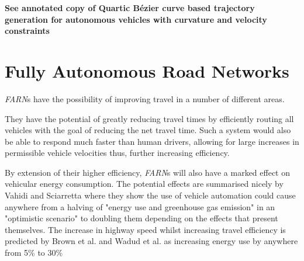 \textbf{See annotated copy of Quartic Bézier curve based trajectory generation for autonomous vehicles with curvature and velocity constraints \cite{chenQuarticBezierCurve2014}}

\section{Fully Autonomous Road Networks}

\textit{FARN}s have the possibility of improving travel in a number of different areas. 

They have the potential of greatly reducing travel times by efficiently routing all vehicles with the goal of reducing the net travel time. Such a system would also be able to respond much faster than human drivers, allowing for large increases in permissible vehicle velocities thus, further increasing efficiency.

By extension of their higher efficiency, \textit{FARN}s will also have a marked effect on vehicular energy consumption. The potential effects are summarised nicely by Vahidi and Sciarretta\cite{vahidiEnergySavingPotentials2018} where they show the use of vehicle automation could cause anywhere from a halving of "energy use and greenhouse gas emission" in an "optimistic scenario" to doubling them depending on the effects that present themselves. The increase in highway speed whilst increasing travel efficiency is predicted by Brown et al.\cite{brownAnalysisPossibleEnergy2014} and Wadud et al.\cite{wadudHelpHindranceTravel2016} as increasing energy use by anywhere from 5\% to 30\%


